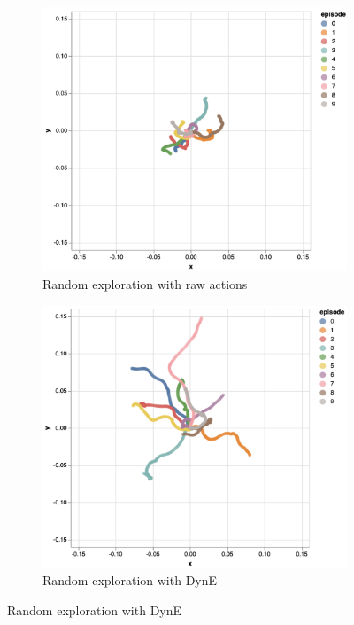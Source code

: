 \begin{subappendices}
\begin{figure}[h]
\centering
\begin{subfigure}[t]{0.45\textwidth}
    \includegraphics[width=\textwidth]{figures/dyne/explore_random.png}
    \caption{Random exploration with raw actions}
\end{subfigure}
\begin{subfigure}[t]{0.45\textwidth}
    \includegraphics[width=\textwidth]{figures/dyne/explore_sto.png}
    \caption{Random exploration with DynE}

\end{subfigure}
\end{figure}
\end{subappendices}
